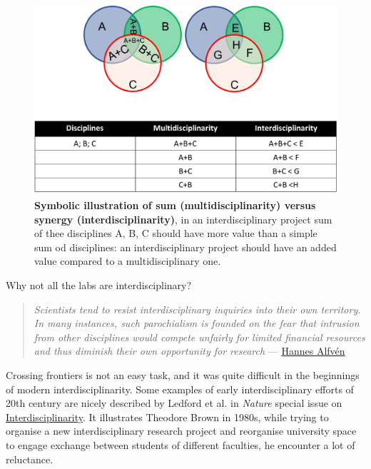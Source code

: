 \documentclass[12pt,]{book}
\theoremstyle{definition}
\theoremstyle{definition}
\theoremstyle{definition}
\theoremstyle{remark}
\begin{document}
\begin{figure}

{\centering \includegraphics[width=0.6\linewidth]{figures-ext/multidisc} 

}

\caption[Symbolic illustration of sum (multidisciplinarity) versus synergy (interdisciplinarity)]{\textbf{Symbolic illustration of sum
(multidisciplinarity) versus synergy (interdisciplinarity)}, in an
interdisciplinary project sum of thee disciplines A, B, C should have
more value than a simple sum od disciplines: an interdisciplinary
project should have an added value compared to a multidisciplinary one.}\label{fig:multidisc}
\end{figure}







Why not all the labs are interdisciplinary?

\begin{quote}
\emph{Scientists tend to resist interdisciplinary inquiries into their
own territory. In many instances, such parochialism is founded on the
fear that intrusion from other disciplines would compete unfairly for
limited financial resources and thus diminish their own opportunity for
research} ---
\href{http://www.azquotes.com/author/28130-Hannes_Alfven}{Hannes Alfvén}
\end{quote}

Crossing frontiers is not an easy task, and it was quite difficult in
the beginnings of modern interdisciplinarity. Some examples of early
interdisciplinary efforts of 20th century are nicely described by
Ledford et al. \citep{Ledford2015} in \emph{Nature} special issue on
\href{https://www.nature.com/news/interdisciplinarity-1.18295}{Interdisciplinarity}.
It illustrates Theodore Brown in 1980s, while trying to organise a new
interdisciplinary research project and reorganise university space to
engage exchange between students of different faculties, he encounter a
lot of reluctance.
\end{document}
